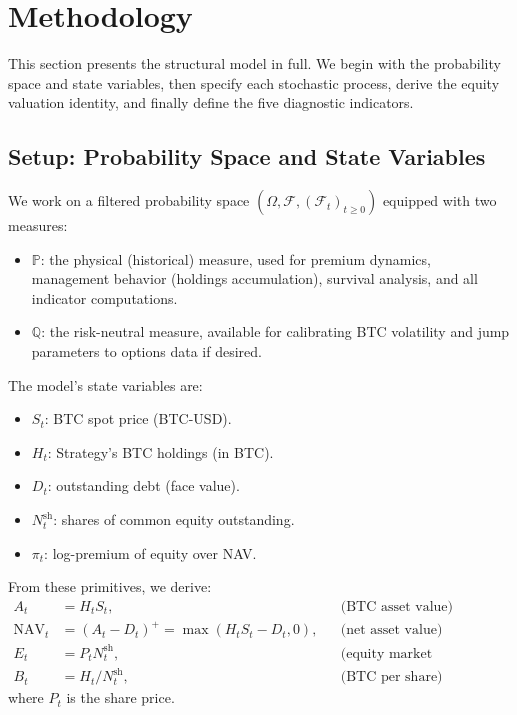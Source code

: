 \section{Methodology}
\label{sec:methodology}

This section presents the structural model in full. We begin with the probability space and state variables, then specify each stochastic process, derive the equity valuation identity, and finally define the five diagnostic indicators.

\subsection{Setup: Probability Space and State Variables}

We work on a filtered probability space $(\Omega, \mathcal{F}, (\mathcal{F}_t)_{t \ge 0})$ equipped with two measures:
\begin{itemize}
    \item $\mathbb{P}$: the physical (historical) measure, used for premium dynamics, management behavior (holdings accumulation), survival analysis, and all indicator computations.
    \item $\mathbb{Q}$: the risk-neutral measure, available for calibrating BTC volatility and jump parameters to options data if desired.
\end{itemize}

The model's state variables are:
\begin{itemize}
    \item $S_t$: BTC spot price (BTC-USD).
    \item $H_t$: Strategy's BTC holdings (in BTC).
    \item $D_t$: outstanding debt (face value).
    \item $N_t^{\text{sh}}$: shares of common equity outstanding.
    \item $\pi_t$: log-premium of equity over NAV.
\end{itemize}

From these primitives, we derive:
\begin{align}
    A_t &= H_t S_t, & &\text{(BTC asset value)} \\
    \text{NAV}_t &= (A_t - D_t)^+ = \max(H_t S_t - D_t, 0), & &\text{(net asset value)} \\
    E_t &= P_t N_t^{\text{sh}}, & &\text{(equity market capitalization)} \\
    B_t &= H_t / N_t^{\text{sh}}, & &\text{(BTC per share)}
\end{align}
where $P_t$ is the share price.

